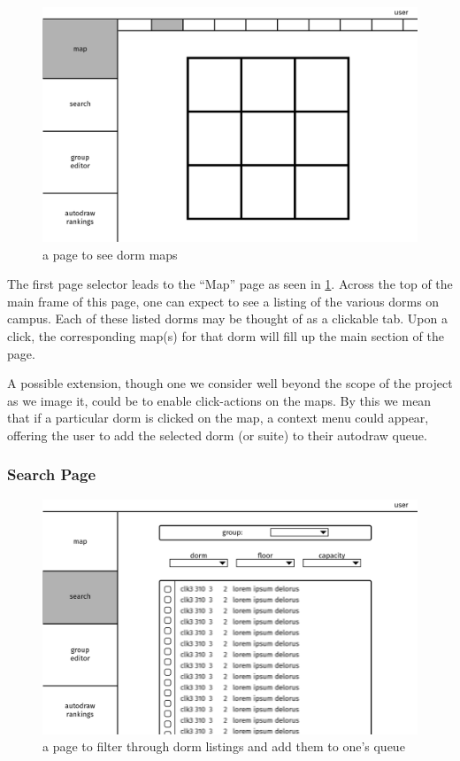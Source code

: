\begin{figure} \centering
\includegraphics[scale=.15]{wireframe/map}
\caption{a page to see dorm maps}
\label{fig:wiremap}
\end{figure}

The first page selector leads to the ``Map'' page as seen in \cref{fig:wiremap}.
Across the top of the main frame of this page, one can expect to see a listing
of the various dorms on campus. Each of these listed dorms may be thought of as
a clickable tab. Upon a click, the corresponding map(s) for that dorm will fill
up the main section of the page.

A possible extension, though one we consider well beyond the scope of the
project as we image it, could be to enable click-actions on the maps. By this we
mean that if a particular dorm is clicked on the map, a context menu could
appear, offering the user to add the selected dorm (or suite) to their autodraw
queue.


\subsubsection{Search Page}
\begin{figure} \centering
\includegraphics[scale=.15]{wireframe/search}
\caption{a page to filter through dorm listings and add them to one's queue}
\label{fig:wiresearch}
\end{figure}

